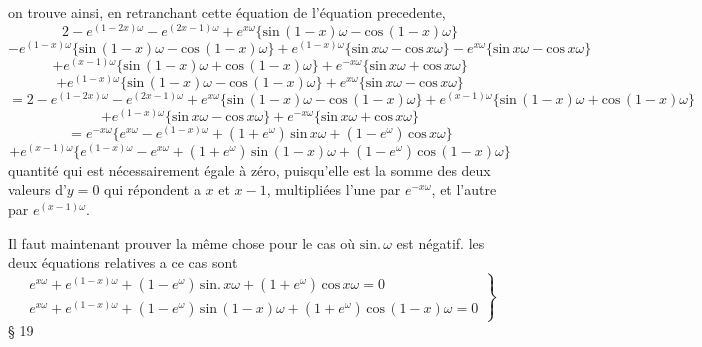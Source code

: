 \documentclass[11pt,a4paper]{article}
\begin{document}
on trouve ainsi, en retranchant cette équation de l'équation precedente,
\[ 2 - e^{(1-2x)\omega} - e^{(2x-1)\omega} + e^{x\omega}\{\text{sin}\,(1-x)\omega - \text{cos}\,(1-x)\omega\} \]
\[ - e^{(1-x)\omega}\{\text{sin}\,(1-x)\omega - \text{cos}\,(1-x)\omega\} + e^{(1-x)\omega}\{\text{sin}\,x\omega - \text{cos}\,x\omega\} - e^{x\omega}\{\text{sin}\,x\omega - \text{cos}\,x\omega\} \]
\[ + e^{(x-1)\omega}\{\text{sin}\,(1-x)\omega + \text{cos}\,(1-x)\omega\} + e^{-x\omega}\{\text{sin}\,x\omega + \text{cos}\,x\omega\} \]
\[ + e^{(1-x)\omega}\{\text{sin}\,(1-x)\omega - \text{cos}\,(1-x)\omega\} + e^{x\omega}\{\text{sin}\,x\omega - \text{cos}\,x\omega\} \]
\[ = 2 - e^{(1-2x)\omega} - e^{(2x-1)\omega} + e^{x\omega}\{\text{sin}\,(1-x)\omega - \text{cos}\,(1-x)\omega\} + e^{(x-1)\omega}\{\text{sin}\,(1-x)\omega + \text{cos}\,(1-x)\omega\} \]
\[ + e^{(1-x)\omega}\{\text{sin}\,x\omega - \text{cos}\,x\omega\} + e^{-x\omega}\{\text{sin}\,x\omega + \text{cos}\,x\omega\} \]
\[ = e^{-x\omega}\{e^{x\omega} - e^{(1-x)\omega} + (1 + e^{\omega})\,\text{sin}\,x\omega + (1 - e^{\omega})\,\text{cos}\,x\omega\} \]
\[ + e^{(x-1)\omega}\{e^{(1-x)\omega} - e^{x\omega} + (1 + e^{\omega})\,\text{sin}\,(1-x)\omega + (1 - e^{\omega})\,\text{cos}\,(1-x)\omega\} \]
quantité qui est nécessairement égale à zéro, puisqu'elle est la somme des
deux valeurs d'$y = 0$ qui répondent a $x$ et $x-1$, multipliées l'une par $e^{-x\omega}$,
et l'autre par $e^{(x-1)\omega}$.

Il faut maintenant prouver la même chose pour le cas où $\text{sin}.\,\omega$ est négatif.
les deux équations relatives a ce cas sont
\[ \left.\begin{array}{l} e^{x\omega} + e^{(1-x)\omega} + (1 - e^{\omega})\,\text{sin}.\,x\omega + (1 + e^{\omega})\,\text{cos}\,x\omega = 0 \\ e^{x\omega} + e^{(1-x)\omega} + (1 - e^{\omega})\,\text{sin}\,(1-x)\omega + (1 + e^{\omega})\,\text{cos}\,(1-x)\omega = 0 \end{array}\right\} \]
§ 19
\end{document}
